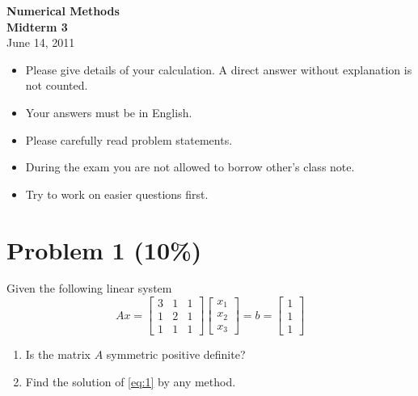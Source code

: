 \documentclass[12pt,a4paper]{article}
\begin{document}
\begin{center}
    \Large \textbf{Numerical Methods} \\
    \Large \textbf{Midterm 3} \\
    \large June 14, 2011
\end{center}

\vspace{0.5cm}

\begin{itemize}
    \item Please give details of your calculation. A direct answer without explanation is not counted.
    \item Your answers must be in English.
    \item Please carefully read problem statements.
    \item During the exam you are not allowed to borrow other's class note.
    \item Try to work on easier questions first.
\end{itemize}

\vspace{0.5cm}

\section*{Problem 1 (10\%)}

Given the following linear system
\begin{equation}
Ax = 
\begin{bmatrix}
3 & 1 & 1 \\
1 & 2 & 1 \\
1 & 1 & 1
\end{bmatrix}
\begin{bmatrix}
x_1 \\
x_2 \\
x_3
\end{bmatrix}
= b = 
\begin{bmatrix}
1 \\
1 \\
1
\end{bmatrix}
\label{eq:1}
\end{equation}

\begin{enumerate}
    \item Is the matrix $A$ symmetric positive definite?
    \item Find the solution of \eqref{eq:1} by any method.
\end{enumerate}
\end{document}
